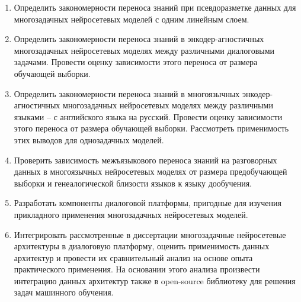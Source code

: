 \begin{enumerate}
  \item {Определить закономерности переноса знаний при псевдоразметке данных для многозадачных нейросетевых моделей с одним линейным слоем.}
  \item {Определить закономерности переноса знаний в энкодер-агностичных многозадачных нейросетевых моделях между различными диалоговыми задачами. Провести оценку зависимости этого переноса от размера обучающей выборки.}
  \item {Определить закономерности переноса знаний в многоязычных энкодер-агностичных многозадачных нейросетевых моделях между различными языками -- с английского языка на русский. Провести оценку зависимости этого переноса от размера обучающей выборки. Рассмотреть применимость этих выводов для однозадачных моделей.}
  \item {Проверить зависимость межъязыкового переноса знаний на разговорных данных в многоязычных нейросетевых моделях от размера предобучающей выборки и генеалогической близости языков к языку дообучения.}
  \item {Разработать компоненты диалоговой платформы, пригодные для изучения прикладного применения многозадачных нейросетевых моделей.} %
  \item {Интегрировать рассмотренные в диссертации многозадачные нейросетевые архитектуры в диалоговую платформу, оценить применимость данных архитектур и провести их сравнительный анализ на основе опыта практического применения. На основании этого анализа произвести интеграцию данных архитектур также в open-source библиотеку для решения задач машинного обучения.}%
  \newline
  \newline
\end{enumerate}


